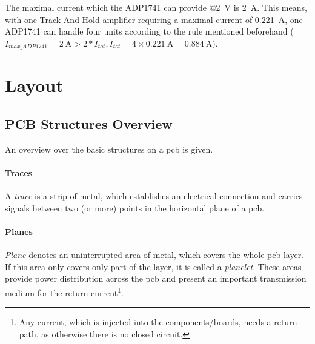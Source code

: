 The maximal current which the ADP1741 can provide @\SI{2}{\volt} is \SI{2}{\ampere}. This means, with one Track-And-Hold amplifier requiring a maximal current of \SI{0.221}{\ampere}, one ADP1741 can handle four units according to the rule mentioned beforehand ($I_{max\_ADP1741} = \SI{2}{\ampere} > 2 * I_{tot}, I_{tot} = 4 \times \SI{0.221}{\ampere} =  \SI{0.884}{\ampere}$).



\section{Layout}


\subsection{PCB Structures Overview} \label{ssec:pcb_structs}
An overview over the basic structures on a \gls{pcb} is given.

\paragraph{Traces}
A \textit{trace} is a strip of metal, which establishes an electrical connection and carries signals between two (or more) points in the horizontal plane of a \gls{pcb}. \cite{xilDecouple}


\paragraph{Planes}
\textit{Plane} denotes an uninterrupted area of metal, which covers the whole \gls{pcb} layer. If this area only covers only part of the layer, it is called a \textit{planelet}. These areas provide power distribution across the \gls{pcb} and present an important transmission medium for the return current\footnote{Any current, which is injected into the components/boards, needs a return path, as otherwise there is no closed circuit.}. \cite{xilDecouple}

